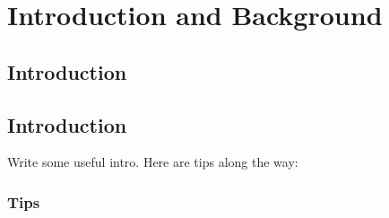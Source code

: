 \documentclass[11pt,
               a4paper,
               bibtotoc,
               idxtotoc,
               headsepline,
               footsepline,
               footexclude,
               BCOR12mm,
               DIV13,
               openany,   %
               ]
               {scrbook}
\begin{document}
\lipsum[2]

\cleardoublepage


\tableofcontents
\thispagestyle{empty}
\cleardoubleemptypage


\mainmatter
\part{Introduction and Background}
\chapter{Introduction}






\chapter{Introduction}
\label{sec:intro}       %
Write some useful intro. Here are tips along the way:

\section{Tips}
\end{document}
